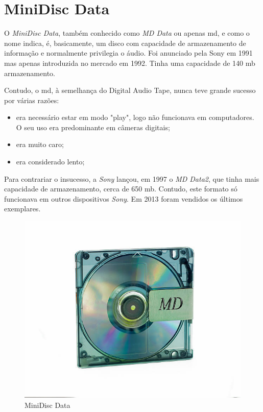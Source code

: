 \documentclass{report}
\begin{document}
\newpage

		\section{MiniDisc Data}
		O 	\textit{MiniDisc Data}, também conhecido como \textit{MD Data} ou apenas \ac{md}, e como o nome indica, é, basicamente, um disco com capacidade de armazenamento de informação e normalmente privilegia o áudio. Foi anunciado pela Sony em 1991 mas apenas introduzida no mercado em 1992. 
Tinha uma capacidade de 140 \ac{mb} armazenamento.

	Contudo, o \ac{md}, à semelhança do Digital Audio Tape, nunca teve grande sucesso por várias razões:
	\begin{itemize} 
		\item era necessário estar em modo "play", logo não funcionava em computadores. O seu uso era predominante em câmeras digitais; 
		\item era muito caro;
		\item era considerado lento;
	\end{itemize} 
	
	Para contrariar o insucesso, a \textit{Sony} lançou, em 1997 o \textit{MD Data2}, que tinha mais capacidade de armazenamento, cerca de 650 \ac{mb}. Contudo, este formato só funcionava em outros dispositivos \textit{Sony}.
	Em 2013 foram vendidos os últimos exemplares.	

\begin{figure} [h]
	\centering
	\includegraphics[scale=0.4]{MD_data.jpg}
	\caption{MiniDisc Data}
\end{figure}
\end{document}
